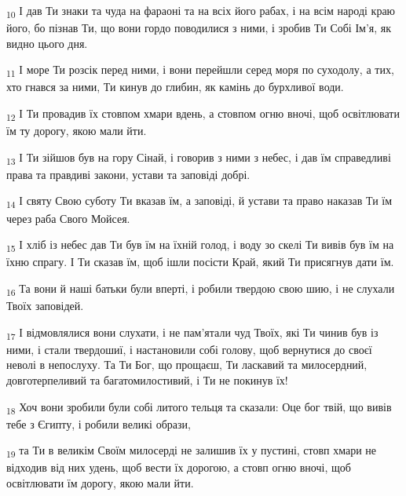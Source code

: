 \begin{tcolorbox}
\textsubscript{10} І дав Ти знаки та чуда на фараоні та на всіх його рабах, і на всім народі краю його, бо пізнав Ти, що вони гордо поводилися з ними, і зробив Ти Собі Ім'я, як видно цього дня.
\end{tcolorbox}
\begin{tcolorbox}
\textsubscript{11} І море Ти розсік перед ними, і вони перейшли серед моря по суходолу, а тих, хто гнався за ними, Ти кинув до глибин, як камінь до бурхливої води.
\end{tcolorbox}
\begin{tcolorbox}
\textsubscript{12} І Ти провадив їх стовпом хмари вдень, а стовпом огню вночі, щоб освітлювати їм ту дорогу, якою мали йти.
\end{tcolorbox}
\begin{tcolorbox}
\textsubscript{13} І Ти зійшов був на гору Сінай, і говорив з ними з небес, і дав їм справедливі права та правдиві закони, устави та заповіді добрі.
\end{tcolorbox}
\begin{tcolorbox}
\textsubscript{14} І святу Свою суботу Ти вказав їм, а заповіді, й устави та право наказав Ти їм через раба Свого Мойсея.
\end{tcolorbox}
\begin{tcolorbox}
\textsubscript{15} І хліб із небес дав Ти був їм на їхній голод, і воду зо скелі Ти вивів був їм на їхню спрагу. І Ти сказав їм, щоб ішли посісти Край, який Ти присягнув дати їм.
\end{tcolorbox}
\begin{tcolorbox}
\textsubscript{16} Та вони й наші батьки були вперті, і робили твердою свою шию, і не слухали Твоїх заповідей.
\end{tcolorbox}
\begin{tcolorbox}
\textsubscript{17} І відмовлялися вони слухати, і не пам'ятали чуд Твоїх, які Ти чинив був із ними, і стали твердошиї, і настановили собі голову, щоб вернутися до своєї неволі в непослуху. Та Ти Бог, що прощаєш, Ти ласкавий та милосердний, довготерпеливий та багатомилостивий, і Ти не покинув їх!
\end{tcolorbox}
\begin{tcolorbox}
\textsubscript{18} Хоч вони зробили були собі литого тельця та сказали: Оце бог твій, що вивів тебе з Єгипту, і робили великі образи,
\end{tcolorbox}
\begin{tcolorbox}
\textsubscript{19} та Ти в великім Своїм милосерді не залишив їх у пустині, стовп хмари не відходив від них удень, щоб вести їх дорогою, а стовп огню вночі, щоб освітлювати їм дорогу, якою мали йти.
\end{tcolorbox}

